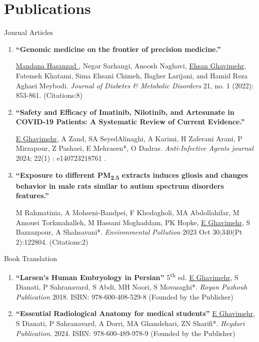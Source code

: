 \documentclass[letterpaper,11pt]{article} %
\begin{document}
\section{Publications}
\large{Journal Articles} \normalsize
\vspace{-0.5\baselineskip}
\begin{enumerate}

\item \hypertarget{art1}{\textbf{“Genomic medicine on the frontier of precision medicine.”}} \hyperlink{Mandana}{Mandana Hasanzad \faArrowAltCircleDown[regular]}, Negar Sarhangi, Anoosh Naghavi, \underline{Ehsan Ghavimehr}, Fatemeh Khatami, Sima Ehsani Chimeh, Bagher Larijani, and Hamid Reza Aghaei Meybodi.  \textit{Journal of Diabetes \& Metabolic Disorders} 21, no. 1 (2022): 853-861.
\href{https://doi.org/10.1007/s40200-021-00880-6}{\faExternalLink*}	 \hfill (Citations:8)

\item \hypertarget{art2}{\textbf{“Safety and Ef\nolinebreak ficacy of Imatinib, Nilotinib, and Artesunate in COVID-19 Patients: A Systematic Review of Current Evidence.”}} \underline{E Ghavimehr}, A Zand, SA SeyedAlinaghi, A Karimi, H Zaferani Arani, P Mirzapour, Z Pashaei, E Mehraeen*, O Dadras. \textit{Anti-Infective Agents journal} 2024; 22(1) : e140723218761 .
\href{https://dx.doi.org/10.2174/2211352521666230714160740}{\faExternalLink*}

\item \hypertarget{art3}{\textbf{“Exposure to dif\nolinebreak ferent PM\textsubscript{2.5} extracts induces gliosis and changes behavior in male rats similar to autism spectrum disorders features.”}} M Rahmatinia, A Mohseni-Bandpei, F Khodagholi, MA Abdollahifar, M Amouei Torkmahalleh, M Hassani Moghaddam, PK Hopke, \underline{E Ghavimehr}, S Bazzazpour, A Shahsavani*.  \textit{Environmental Pollution} 2023 Oct 30;340(Pt 2):122804.
\href{https://www.sciencedirect.com/science/article/abs/pii/S0269749123018067}{\faExternalLink*}  \hfill (Citations:2)
\end{enumerate}

\large{Book Translation} \normalsize
\vspace{-0.5\baselineskip}
\begin{enumerate}

\item \textbf{“Larsen's Human Embryology in Persian”} 5\textsuperscript{th} ed. \underline{E Ghavimehr}, S Dianati, P Sahranavard, S Abdi, MH Noori, S Movasaghi*. \textit{Royan Pazhouh Publication} 2018. ISBN: 978-600-408-529-8 \hfill (Founded by the Publisher)

\item \textbf{“Essential Radiological Anatomy for medical students”} \underline{E Ghavimehr}, S Dianati, P Sahranavard, A Dorri, MA Ghandehari, ZN Sharifi*. \textit{Heydari Publication}. 2024. ISBN: 978-600-489-978-9 \hfill (Founded by the Publisher)

\end{enumerate}
\end{document}

